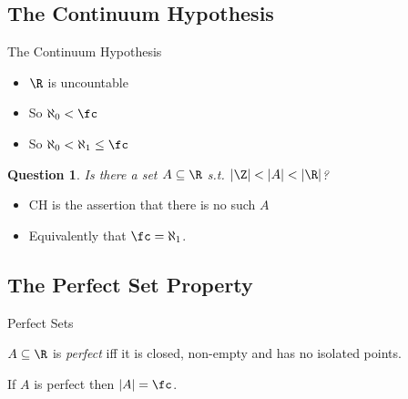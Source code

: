 \documentclass{beamer}
\newtheorem*{question}{Question}
\begin{document}
\subsection{The Continuum Hypothesis}

\begin{frame}{The Continuum Hypothesis}

\begin{fact}
\begin{itemize}
  \item $\R$ is uncountable
  \item So $\aleph_0 < \fc$
  \item So $\aleph_0 < \aleph_1 \leq \fc$
\end{itemize}
\end{fact}

\begin{question}
Is there a set $A \subseteq \R$ s.t. $|\Z| < |A| < |\R|$?
\end{question}

\begin{definition}
\begin{itemize}
  \item CH is the assertion that there is no such $A$
  \item Equivalently that $\fc = \aleph_1$.
\end{itemize}
\end{definition}

\end{frame}

\subsection{The Perfect Set Property}

\begin{frame}{Perfect Sets}

\begin{definition}
$A\subseteq\R$ is \emph{perfect} iff it is closed, non-empty
and has no isolated points.
\end{definition}

\begin{lemma}
If $A$ is perfect then $|A| = \fc$.
\end{lemma}

\end{frame}
\end{document}
